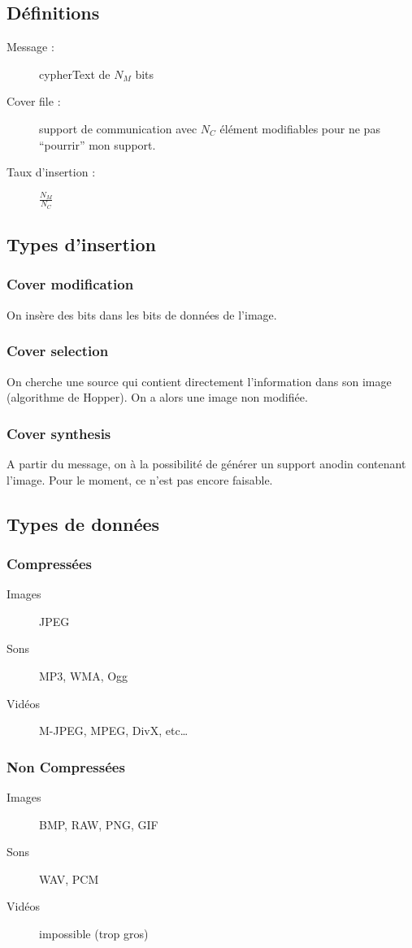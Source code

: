 \subsection{Définitions}
\begin{description}
 \item[Message :] cypherText de $N_M$ bits
 \item[Cover file :] support de communication avec $N_C$ élément modifiables pour ne pas \enquote{pourrir} mon support.
 \item[Taux d'insertion :] $\frac{N_M}{N_C}$
\end{description}
\subsection{Types d'insertion}
\subsubsection{Cover modification}
On insère des bits dans les bits de données de l'image.
\subsubsection{Cover selection}
On cherche une source qui contient directement l'information dans son image (algorithme de Hopper). On a alors une image non modifiée.
\subsubsection{Cover synthesis}
A partir du message, on à la possibilité de générer un support anodin contenant l'image. Pour le moment, ce n'est pas encore faisable.
\subsection{Types de données}
\subsubsection{Compressées}
\begin{description}
 \item[Images] JPEG
 \item[Sons] MP3, WMA, Ogg
 \item[Vidéos] M-JPEG, MPEG, DivX, etc\ldots
\end{description}
\subsubsection{Non Compressées}
\begin{description}
 \item[Images] BMP, RAW, PNG, GIF
 \item[Sons] WAV, PCM
 \item[Vidéos] impossible (trop gros)
\end{description}
